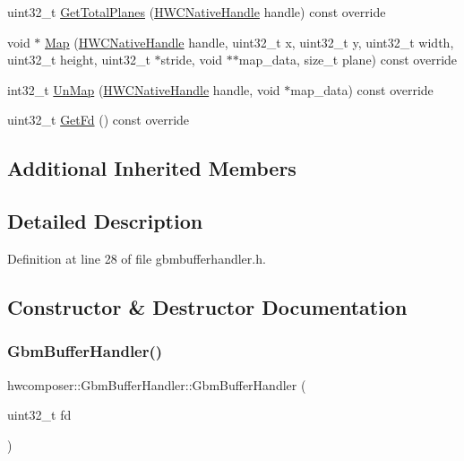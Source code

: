 \begin{DoxyCompactItemize}
\item 
uint32\+\_\+t \mbox{\hyperlink{classhwcomposer_1_1GbmBufferHandler_a55b6cac51fced2198ae9aee706d03452}{Get\+Total\+Planes}} (\mbox{\hyperlink{alios_2platformdefines_8h_ac0a2eaf260f556d17fe489911f017bdf}{H\+W\+C\+Native\+Handle}} handle) const override
\item 
void $\ast$ \mbox{\hyperlink{classhwcomposer_1_1GbmBufferHandler_ad6120de07407c36ed5ab99c8fcb628fd}{Map}} (\mbox{\hyperlink{alios_2platformdefines_8h_ac0a2eaf260f556d17fe489911f017bdf}{H\+W\+C\+Native\+Handle}} handle, uint32\+\_\+t x, uint32\+\_\+t y, uint32\+\_\+t width, uint32\+\_\+t height, uint32\+\_\+t $\ast$stride, void $\ast$$\ast$map\+\_\+data, size\+\_\+t plane) const override
\item 
int32\+\_\+t \mbox{\hyperlink{classhwcomposer_1_1GbmBufferHandler_af26a61bbdd91d36780e41b406e8b8dd9}{Un\+Map}} (\mbox{\hyperlink{alios_2platformdefines_8h_ac0a2eaf260f556d17fe489911f017bdf}{H\+W\+C\+Native\+Handle}} handle, void $\ast$map\+\_\+data) const override
\item 
uint32\+\_\+t \mbox{\hyperlink{classhwcomposer_1_1GbmBufferHandler_ac204254aef6007d09474f8e76f9b6470}{Get\+Fd}} () const override
\end{DoxyCompactItemize}
\subsection*{Additional Inherited Members}


\subsection{Detailed Description}


Definition at line 28 of file gbmbufferhandler.\+h.



\subsection{Constructor \& Destructor Documentation}
\mbox{\label{classhwcomposer_1_1GbmBufferHandler_a2dd2cbac7542ffaead762e797ab673cc}} 
\subsubsection{\texorpdfstring{Gbm\+Buffer\+Handler()}{GbmBufferHandler()}}
{\footnotesize\ttfamily hwcomposer\+::\+Gbm\+Buffer\+Handler\+::\+Gbm\+Buffer\+Handler (\begin{DoxyParamCaption}\item[{uint32\+\_\+t}]{fd }\end{DoxyParamCaption})\hspace{0.3cm}{\ttfamily [explicit]}}



